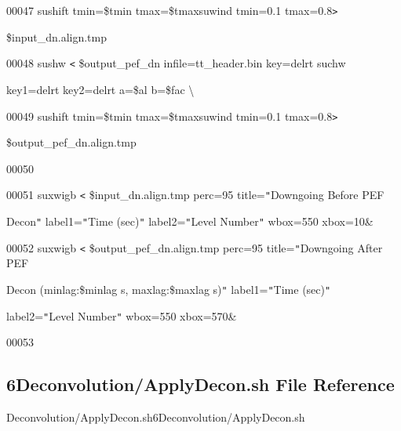 \documentclass{article}
\begin{document}
\vspace{4pt}
\parindent=0pt
00047            \textbar{} sushift tmin=\$tmin tmax=\$tmax\textbar{}suwind tmin=0.1 
tmax=0.8\texttt{>} 

\vspace{4pt}
\parindent=18pt
\$input\_dn.align.tmp

\vspace{4pt}
\parindent=0pt
00048 sushw \texttt{<} \$output\_pef\_dn infile=tt\_header.bin key=delrt \textbar{} 
suchw 

\vspace{4pt}
key1=delrt key2=delrt a=\$al b=\$fac \textbackslash{}

\vspace{4pt}
00049            \textbar{} sushift tmin=\$tmin tmax=\$tmax\textbar{}suwind tmin=0.1 
tmax=0.8\texttt{>} 

\vspace{4pt}
\parindent=18pt
\$output\_pef\_dn.align.tmp

\vspace{4pt}
\parindent=0pt
00050 

\vspace{4pt}
00051 suxwigb \texttt{<} \$input\_dn.align.tmp perc=95 title=\texttt{"}Downgoing 
Before PEF 

\vspace{4pt}
Decon\texttt{"} label1=\texttt{"}Time (sec)\texttt{"} label2=\texttt{"}Level Number\texttt{"} 
 wbox=550 xbox=10\&

\vspace{4pt}
00052 suxwigb \texttt{<} \$output\_pef\_dn.align.tmp perc=95 title=\texttt{"}Downgoing 
 After PEF 

\vspace{4pt}
\parindent=18pt
Decon (minlag:\$minlag s, maxlag:\$maxlag s)\texttt{"}  label1=\texttt{"}Time (sec)\texttt{"} 

\vspace{4pt}
label2=\texttt{"}Level Number\texttt{"}  wbox=550 xbox=570\&

\vspace{4pt}
\parindent=0pt
00053 \pagebreak{}

\vspace{36pt}
\subsection*{{\large{}\textbf{6Deconvolution/ApplyDecon.sh File Reference}}}

\vspace{12pt}
Deconvolution/ApplyDecon.sh6Deconvolution/ApplyDecon.sh\label{AAAAAAAAAN}
\end{document}
